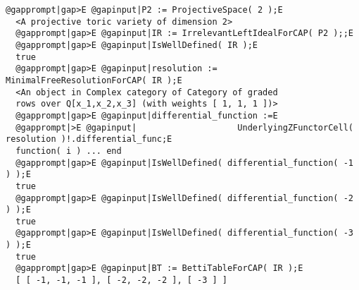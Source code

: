 \documentclass[a4paper,11pt]{report}
\begin{document}
{{\begin{Verbatim}[commandchars=@|E,fontsize=\small,frame=single,label=Example]
  @gapprompt|gap>E @gapinput|P2 := ProjectiveSpace( 2 );E
  <A projective toric variety of dimension 2>
  @gapprompt|gap>E @gapinput|IR := IrrelevantLeftIdealForCAP( P2 );;E
  @gapprompt|gap>E @gapinput|IsWellDefined( IR );E
  true
  @gapprompt|gap>E @gapinput|resolution := MinimalFreeResolutionForCAP( IR );E
  <An object in Complex category of Category of graded
  rows over Q[x_1,x_2,x_3] (with weights [ 1, 1, 1 ])>
  @gapprompt|gap>E @gapinput|differential_function :=E
  @gapprompt|>E @gapinput|                    UnderlyingZFunctorCell( resolution )!.differential_func;E
  function( i ) ... end
  @gapprompt|gap>E @gapinput|IsWellDefined( differential_function( -1 ) );E
  true
  @gapprompt|gap>E @gapinput|IsWellDefined( differential_function( -2 ) );E
  true
  @gapprompt|gap>E @gapinput|IsWellDefined( differential_function( -3 ) );E
  true
  @gapprompt|gap>E @gapinput|BT := BettiTableForCAP( IR );E
  [ [ -1, -1, -1 ], [ -2, -2, -2 ], [ -3 ] ]
\end{Verbatim}
 }

 }

   
\end{document}
